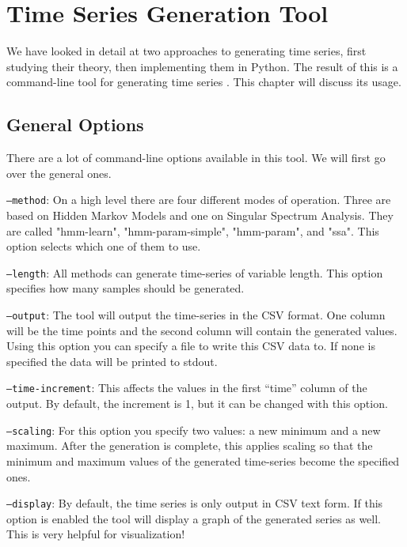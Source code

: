 \chapter{Time Series Generation Tool}\label{chapter:tool}

We have looked in detail at two approaches to generating time series, first studying their theory, then implementing them in Python. The result of this is a command-line tool for generating time series \parencite{tsgenerator}. This chapter will discuss its usage. 

\section{General Options}

There are a lot of command-line options available in this tool. We will first go over the general ones. 

\texttt{---method}: On a high level there are four different modes of operation. Three are based on Hidden Markov Models and one on Singular Spectrum Analysis. They are called "hmm-learn", "hmm-param-simple", "hmm-param", and "ssa". This option selects which one of them to use. 

\texttt{---length}: All methods can generate time-series of variable length. This option specifies how many samples should be generated. 

\texttt{---output}: The tool will output the time-series in the CSV format. One column will be the time points and the second column will contain the generated values. Using this option you can specify a file to write this CSV data to. If none is specified the data will be printed to stdout. 

\texttt{---time-increment}: This affects the values in the first ``time'' column of the output. By default, the increment is 1, but it can be changed with this option. 

\texttt{---scaling}: For this option you specify two values: a new minimum and a new maximum. After the generation is complete, this applies scaling so that the minimum and maximum values of the generated time-series become the specified ones. 

\texttt{---display}: By default, the time series is only output in CSV text form. If this option is enabled the tool will display a graph of the generated series as well. This is very helpful for visualization!

